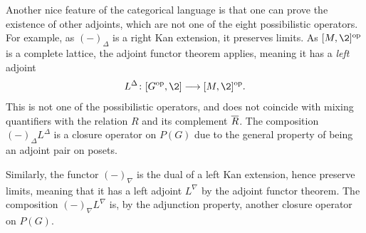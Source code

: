 Another nice feature of the categorical language is that one can prove the existence of other adjoints, which are not one of the eight possibilistic operators. For example, as $(-)_\Delta$ is a right Kan extension, it preserves limits. As $[M,\2]\op$ is a complete lattice, the adjoint functor theorem applies, meaning it has a \emph{left} adjoint 
\[L^\Delta\: [G\op,\2]\to [M,\2]\op.\] 
This is not one of the possibilistic operators, and does not coincide with mixing quantifiers with the relation $R$ and its complement $\overline{R}$. The composition $(-)_\Delta L^\Delta$ is a closure operator on $P(G)$ due to the general property of being an adjoint pair on posets. 

Similarly, the functor $(-)_\nabla$ is the dual of a left Kan extension, hence preserve limits, meaning that it has a left adjoint $L^\nabla$ by the adjoint functor theorem. The composition $(-)_\nabla L^\nabla$ is, by the adjunction property, another closure operator on $P(G)$. 